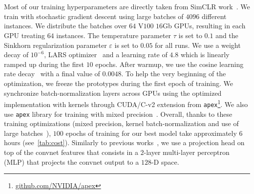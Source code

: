 \\
\tab {}
\\
\\
\tab {}
\\
\tab {}
\\
\tab \tab {}
\\
\\
\\
\\
\tab {}
\\
\tab {}
\\
\tab {}
\\
\tab {}
\\
\tab {}
\\
\tab \tab {}
\\
\tab \tab {}
\\
\tab \tab {}
\\
\tab {}
\\
\\
Most of our training hyperparameters are directly taken from SimCLR work~\cite{chen2020simple}.
We train \OURS with stochastic gradient descent using large batches of $4096$ different instances.
We distribute the batches over $64$ V$100$ $16$Gb GPUs, resulting in each GPU treating $64$ instances.
The temperature parameter $\tau$ is set to $0.1$ and the Sinkhorn regularization parameter $\varepsilon$ is set to $0.05$ for all runs.
We use a weight decay of $10^{-6}$, LARS optimizer~\cite{you2017large} and a learning rate of $4.8$ which is linearly ramped up during the first $10$ epochs.
After warmup, we use the cosine learning rate decay~\cite{loshchilov2016sgdr,misra2019self} with a final value of $0.0048$.
To help the very beginning of the optimization, we freeze the prototypes during the first epoch of training.
We synchronize batch-normalization layers across GPUs using the optimized implementation with kernels through CUDA/C-v2 extension from \texttt{apex}\footnote{\scriptsize\url{github.com/NVIDIA/apex}}.
We also use \texttt{apex} library for training with mixed precision~\cite{micikevicius2017mixed}.
Overall, thanks to these training optimizations (mixed precision, kernel batch-normalization and use of large batches~\cite{goyal2017accurate}), $100$ epochs of training for our best \OURS model take approximately $6$ hours (see~\cref{tab:cost}).
Similarly to previous works~\cite{chen2020simple,chen2020improved,li2020prototypical}, we use a projection head on top of the convnet features that consists in a $2$-layer multi-layer perceptron (MLP) that projects the convnet output to a $128$-D space.

